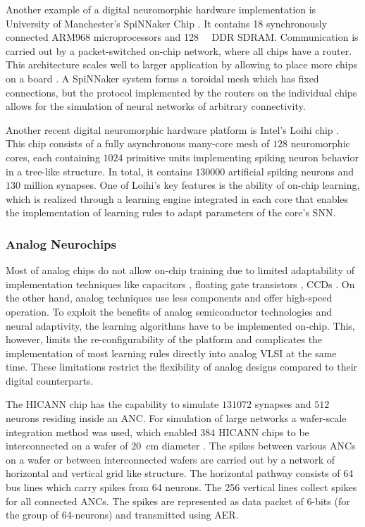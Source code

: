 Another example of a digital neuromorphic hardware implementation is University of Manchester's \ac{SpiNNaker} Chip \cite{Furber2014}.
It contains 18 synchronously connected ARM968 microprocessors and \SI{128}{\mega\byte} \ac{DDR} \ac{SDRAM}.
Communication is carried out by a packet-switched on-chip network, where all chips have a router.
This architecture scales well to larger application by allowing to place more chips on a board \cite{Painkras2013,Navaridas2009}.
A \ac{SpiNNaker} system forms a toroidal mesh which has fixed connections, but the protocol implemented by the routers on the individual chips allows for the simulation of neural networks of arbitrary connectivity.

Another recent digital neuromorphic hardware platform is Intel's Loihi chip \cite{Davies2018}.
This chip consists of a fully asynchronous many-core mesh of $128$ neuromorphic cores, each containing $1024$ primitive units implementing spiking neuron behavior in a tree-like structure.
In total, it contains $130000$ artificial spiking neurons and $130$ million synapses.
One of Loihi's key features is the ability of on-chip learning, which is realized through a learning engine integrated in each core that enables the implementation of learning rules to adapt parameters of the core's \ac{SNN}.

\subsubsection{Analog Neurochips}

Most of analog chips do not allow on-chip training due to limited adaptability of implementation techniques like capacitors \cite{Schwartz1990}, floating gate transistors \cite{Holler1989}, \acp{CCD} \cite{Agranat1990}.
On the other hand, analog techniques use less components and offer high-speed operation.
To exploit the benefits of analog semiconductor technologies and neural adaptivity, the learning algorithms have to be implemented on-chip.
This, however, limits the re-configurability of the platform and complicates the implementation of most learning rules directly into analog \ac{VLSI} at the same time.
These limitations restrict the flexibility of analog designs compared to their digital counterparts.

The \ac{HICANN} chip \cite{Schemmel2008} has the capability to simulate $131072$ synapses and $512$ neurons residing inside an \ac{ANC}.
For simulation of large networks a wafer-scale integration method was used, which enabled $384$ \ac{HICANN} chips to be interconnected on a wafer of \SI{20}{\centi\meter} diameter \cite{Schemmel2010}.
The spikes between various \acp{ANC} on a wafer or between interconnected wafers are carried out by a network of horizontal and vertical grid like structure.
The horizontal pathway consists of 64 bus lines which carry spikes from 64 neurons.
The 256 vertical lines collect spikes for all connected \acp{ANC}.
The spikes are represented as data packet of 6-bits (for the group of 64-neurons) and transmitted using \ac{AER}. 

